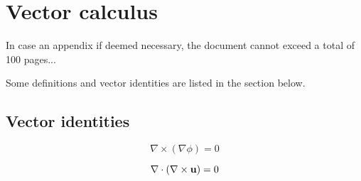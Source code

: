 \chapter{Vector calculus}
\label{chapter:appendixVectors}

In case an appendix if deemed necessary, the document cannot exceed a total of 100 pages...

Some definitions and vector identities are listed in the section below.

\section{Vector identities}
\label{section:vectorIdentities}

\begin{equation}
	\nabla \times \left( \nabla \phi \right) = 0
	\label{eq:cross_nnp}
\end{equation}

\begin{equation}
	\nabla \cdot \left( \nabla \times {\bf u} \right) = 0
	\label{eq:dotCross_nnu}
\end{equation}


